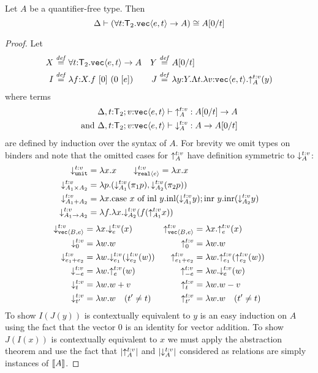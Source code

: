 \begin{lemma}\label{lem:transiso}
Let $A$ be a quantifier-free type. Then
\[
\Delta\vdash(\forall t\mathord:\mathsf{T}_2.\textup{\texttt{vec}}\langle e,t \rangle\to A)
\cong A[0/t]
\]
\end{lemma}
\begin{proof}
Let 
\begin{align*}
X & \stackrel{\mathit{def}}= \forall t\mathord:\mathsf{T}_2.\textup{\texttt{vec}}\langle e,t \rangle\to A
& 
Y & \stackrel{\mathit{def}}= A[0/t]\\
I & \stackrel{\mathit{def}}= \lambda f\mathord: X. f\ [0]\ (0\ [e])
& 
J & \stackrel{\mathit{def}}= \lambda y\mathord: Y. \Lambda t.\lambda v\mathord:\textup{\texttt{vec}}\langle e,t \rangle. \mathord\uparrow_{A}^{t\mathord:v} (y)
\end{align*}
where terms 
\begin{align*}
&
\Delta,t\mathord:\mathsf{T}_2;v\mathord:\textup{\texttt{vec}}\langle e,t \rangle\vdash \mathord\uparrow_{A}^{t\mathord:v} : A[0/t] \to A
\\\text{and } &
\Delta,t\mathord:\mathsf{T}_2;v\mathord:\textup{\texttt{vec}}\langle e,t \rangle\vdash \mathord\downarrow_{A}^{t\mathord:v} : A\to A[0/t]
\end{align*}
are defined by induction over the syntax of $A$. For brevity we omit types on binders
and note that the omitted cases for $\mathord\uparrow_{A}^{t\mathord:v}$ 
have definition symmetric to $\mathord\downarrow_{A}^{t\mathord:v}$:
\begin{align*}
\mathord\downarrow_{\textup{\texttt{unit}}}^{t\mathord:v} &= \lambda x. x
\qquad 
\mathord\downarrow_{\textup{\texttt{real}}\langle e \rangle}^{t\mathord:v} = \lambda x. x
\\
\mathord\downarrow_{A_1\times A_2}^{t\mathord:v} &= \lambda p. (\mathord\downarrow_{A_1}^{t\mathord:v}(\pi_1 p),\mathord\downarrow_{A_2}^{t\mathord:v}(\pi_2 p))
\\
\mathord\downarrow_{A_1 + A_2}^{t\mathord:v} &= \lambda x.
\textrm{case}\ x\ \textrm{of}\ \textrm{inl}\ y.\textrm{inl}(\mathord\downarrow_{A_1}^{t\mathord:v} y); \textrm{inr}\ y.\textrm{inr}(\mathord\downarrow_{A_2}^{t\mathord:v} y)
\\ 
\mathord\downarrow_{A_1\to A_2}^{t\mathord:v} &= \lambda f. \lambda x. \mathord\downarrow_{A_2}^{t\mathord:v} (f(\mathord\uparrow_{A_1}^{t\mathord:v} x))
\end{align*}
\begin{align*}
\mathord\downarrow_{\textup{\texttt{vec}}\langle B,e \rangle}^{t\mathord:v} &= \lambda x. \mathord\downarrow_{e}^{t\mathord:v} (x) 
&
\mathord\uparrow_{\textup{\texttt{vec}}\langle B,e \rangle}^{t\mathord:v} &= \lambda x. \mathord\uparrow_{e}^{t\mathord:v} (x)
\\
\mathord\downarrow_{0}^{t\mathord:v} &= \lambda w.w
&
\mathord\uparrow_{0}^{t\mathord:v} &= \lambda w.w
\\ 
\mathord\downarrow_{e_1+e_2}^{t\mathord:v} &= \lambda w.\mathord\downarrow_{e_1}^{t\mathord:v}(\mathord\downarrow_{e_2}^{t\mathord:v}(w))
&
\mathord\uparrow_{e_1+e_2}^{t\mathord:v} &= \lambda w.\mathord\uparrow_{e_1}^{t\mathord:v}(\mathord\uparrow_{e_2}^{t\mathord:v}(w))
\\
\mathord\downarrow_{-e}^{t\mathord:v} &= \lambda w.\mathord\uparrow_{e}^{t\mathord:v} (w)
&
\mathord\uparrow_{-e}^{t\mathord:v} &= \lambda w.\mathord\downarrow_{e}^{t\mathord:v} (w)
\\
\mathord\downarrow_{t}^{t\mathord:v} &= \lambda w.w + v 
&
\mathord\uparrow_{t}^{t\mathord:v} &= \lambda w.w - v
\\
\mathord\downarrow_{t'}^{t\mathord:v} &= \lambda w.w\quad(t'\neq t)
&
\mathord\uparrow_{t'}^{t\mathord:v} &= \lambda w.w\quad(t'\neq t)
\end{align*}
To show $I(J(y))$ is contextually equivalent to $y$ is an easy
induction on $A$ using the fact that the vector $0$
is an identity for vector addition. To show $J(I(x))$ is contextually
equivalent to $x$ we must apply the abstraction theorem and use
the fact that $\left| \mathord\uparrow_{A}^{t\mathord:v}\right|$ and $\left| \mathord\downarrow_{A}^{t\mathord:v}\right|$ 
considered as relations are simply instances of $\llbracket A \rrbracket{}{}$.
\end{proof}
